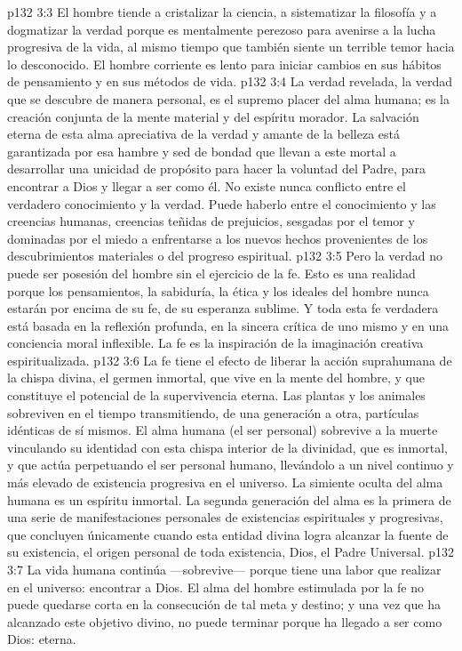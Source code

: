 \vs p132 3:3 El hombre tiende a cristalizar la ciencia, a sistematizar la filosofía y a dogmatizar la verdad porque es mentalmente perezoso para avenirse a la lucha progresiva de la vida, al mismo tiempo que también siente un terrible temor hacia lo desconocido. El hombre corriente es lento para iniciar cambios en sus hábitos de pensamiento y en sus métodos de vida.
\vs p132 3:4 La verdad revelada, la verdad que se descubre de manera personal, es el supremo placer del alma humana; es la creación conjunta de la mente material y del espíritu morador. La salvación eterna de esta alma apreciativa de la verdad y amante de la belleza está garantizada por esa hambre y sed de bondad que llevan a este mortal a desarrollar una unicidad de propósito para hacer la voluntad del Padre, para encontrar a Dios y llegar a ser como él. No existe nunca conflicto entre el verdadero conocimiento y la verdad. Puede haberlo entre el conocimiento y las creencias humanas, creencias teñidas de prejuicios, sesgadas por el temor y dominadas por el miedo a enfrentarse a los nuevos hechos provenientes de los descubrimientos materiales o del progreso espiritual.
\vs p132 3:5 Pero la verdad no puede ser posesión del hombre sin el ejercicio de la fe. Esto es una realidad porque los pensamientos, la sabiduría, la ética y los ideales del hombre nunca estarán por encima de su fe, de su esperanza sublime. Y toda esta fe verdadera está basada en la reflexión profunda, en la sincera crítica de uno mismo y en una conciencia moral inflexible. La fe es la inspiración de la imaginación creativa espiritualizada.
\vs p132 3:6 La fe tiene el efecto de liberar la acción suprahumana de la chispa divina, el germen inmortal, que vive en la mente del hombre, y que constituye el potencial de la supervivencia eterna. Las plantas y los animales sobreviven en el tiempo transmitiendo, de una generación a otra, partículas idénticas de sí mismos. El alma humana (el ser personal) sobrevive a la muerte vinculando su identidad con esta chispa interior de la divinidad, que es inmortal, y que actúa perpetuando el ser personal humano, llevándolo a un nivel continuo y más elevado de existencia progresiva en el universo. La simiente oculta del alma humana es un espíritu inmortal. La segunda generación del alma es la primera de una serie de manifestaciones personales de existencias espirituales y progresivas, que concluyen únicamente cuando esta entidad divina logra alcanzar la fuente de su existencia, el origen personal de toda existencia, Dios, el Padre Universal.
\vs p132 3:7 La vida humana continúa ---sobrevive--- porque tiene una labor que realizar en el universo: encontrar a Dios. El alma del hombre estimulada por la fe no puede quedarse corta en la consecución de tal meta y destino; y una vez que ha alcanzado este objetivo divino, no puede terminar porque ha llegado a ser como Dios: eterna.
